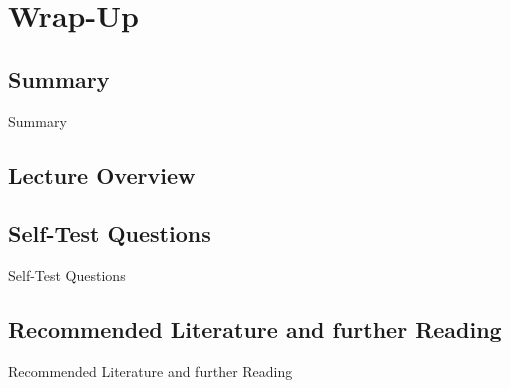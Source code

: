 \section{Wrap-Up}

\subsection{Summary}

\begin{frame}{Summary}{}

\end{frame}


\subsection{Lecture Overview}



\subsection{Self-Test Questions}

\begin{frame}{Self-Test Questions}{}

\end{frame}

\subsection{Recommended Literature and further Reading}

\begin{frame}{Recommended Literature and further Reading}{}
	\footnotesize
	\begin{thebibliography}{2}

	\end{thebibliography}
\end{frame}


\makethanks


